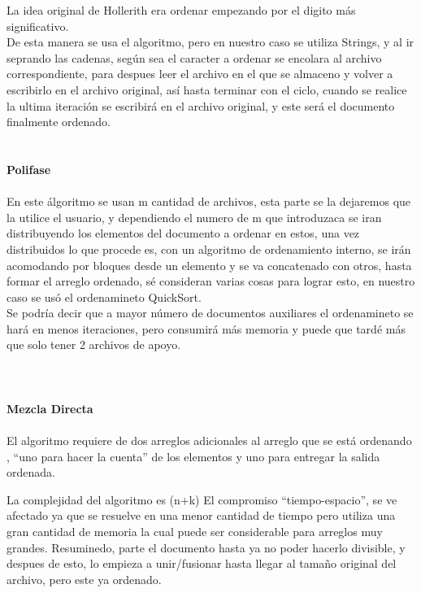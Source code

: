 \documentclass[12pt,a4paper]{article}
\begin{document}
 La idea original de Hollerith era ordenar empezando por el digito más significativo.
\\De esta manera se usa el algoritmo, pero en nuestro caso se utiliza Strings, y al ir seprando las cadenas, según sea el caracter a ordenar se encolara al archivo correspondiente, para despues leer el archivo en el que se almaceno y volver a escribirlo en el archivo original, así hasta terminar con el ciclo, cuando se realice la ultima iteración se escribirá en el archivo original, y este será el documento finalmente ordenado.
\\
\\
	\\
	\huge \textbf {Polifase}
	\\
	\\
	\normalsize En este álgoritmo se usan m cantidad de archivos, esta parte se la dejaremos que la utilice el usuario, y dependiendo el numero de m que introduzaca se iran distribuyendo los elementos del documento a ordenar en estos, una vez distribuidos lo que procede es, con un algoritmo de ordenamiento interno, se irán acomodando por bloques desde un elemento y se va concatenado con otros, hasta formar el arreglo ordenado, sé consideran varias cosas para lograr esto, en nuestro caso se usó el ordenamineto QuickSort.
	\\
	Se podría decir que a mayor número de documentos auxiliares el ordenamineto se hará en menos iteraciones, pero consumirá más memoria y puede que tardé más que solo tener 2 archivos de apoyo.
	\\
	\\
    \\
	\\
	\huge \textbf {Mezcla Directa}
	\\
	\\
	\normalsize El algoritmo requiere de dos arreglos adicionales al arreglo que se está ordenando , “uno para hacer la cuenta” de los elementos y uno para entregar la salida ordenada. 

La complejidad del algoritmo es (n+k)
El compromiso “tiempo-espacio”, se ve afectado ya que se resuelve en una menor cantidad de tiempo pero utiliza una gran cantidad de memoria la cual puede ser considerable para arreglos muy grandes.
Resuminedo, parte el documento hasta ya no poder hacerlo divisible, y despues de esto, lo empieza a unir/fusionar hasta llegar al tamaño original del archivo, pero este ya ordenado. 
\end{document}
